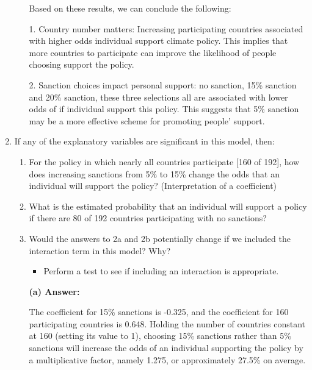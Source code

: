 \documentclass[12pt,letterpaper]{article}
\begin{document}
\begin{enumerate}
\begin{enumerate}
		Based on these results, we can conclude the following:
		
		1.  Country number matters: Increasing participating countries associated with higher odds individual support climate policy. This implies that more countries to participate  can improve the likelihood of people choosing support the policy.
		
		2. Sanction choices impact personal support: no sanction, 15\% sanction  and 20\% sanction, these three selections all are associated with lower odds of if individual support this policy. This suggests that 5\% sanction may be a more effective scheme for promoting people' support.
		
		\newpage
		
		
	\end{enumerate}
	
	\item
	If any of the explanatory variables are significant in this model, then:
	\begin{enumerate}
		\item
		For the policy in which nearly all countries participate [160 of 192], how does increasing sanctions from 5\% to 15\% change the odds that an individual will support the policy? (Interpretation of a coefficient)
		\item
		What is the estimated probability that an individual will support a policy if there are 80 of 192 countries participating with no sanctions? 
		\item
		Would the answers to 2a and 2b potentially change if we included the interaction term in this model? Why? 
		\begin{itemize}
			\item Perform a test to see if including an interaction is appropriate.
		\end{itemize}
		
		\noindent \textbf{(a) Answer:}
			
		The coefficient for 15\% sanctions is -0.325, and the coefficient for 160 participating countries is 0.648. Holding the number of countries constant at 160 (setting its value to 1), choosing 15\% sanctions rather than 5\% sanctions will increase the odds of an individual supporting the policy by a multiplicative factor, namely 1.275, or approximately 27.5\%  on average.
		

\end{enumerate}
\end{enumerate}
\end{document}
